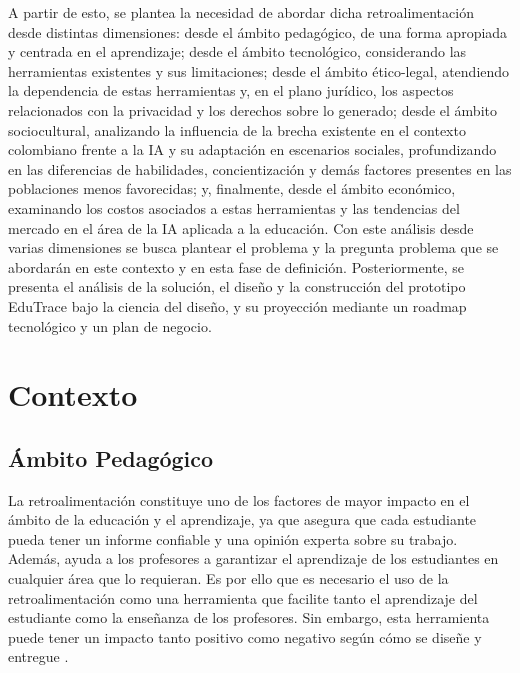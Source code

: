 \documentclass[letterpaper, 10 pt, conference]{ieeeconf}
\begin{document}
A partir de esto, se plantea la necesidad de abordar dicha retroalimentación desde distintas dimensiones: desde el ámbito pedagógico, de una forma apropiada y centrada en el aprendizaje; desde el ámbito tecnológico, considerando las herramientas existentes y sus limitaciones; desde el ámbito ético-legal, atendiendo la dependencia de estas herramientas y, en el plano jurídico, los aspectos relacionados con la privacidad y los derechos sobre lo generado; desde el ámbito sociocultural, analizando la influencia de la brecha existente en el contexto colombiano frente a la IA y su adaptación en escenarios sociales, profundizando en las diferencias de habilidades, concientización y demás factores presentes en las poblaciones menos favorecidas; y, finalmente, desde el ámbito económico, examinando los costos asociados a estas herramientas y las tendencias del mercado en el área de la IA aplicada a la educación. Con este análisis desde varias dimensiones se busca plantear el problema y la pregunta problema que se abordarán en este contexto y en esta fase de definición. Posteriormente, se presenta el análisis de la solución, el diseño y la construcción del prototipo EduTrace bajo la ciencia del diseño, y su proyección mediante un roadmap tecnológico y un plan de negocio.




\section{Contexto} 

\subsection{Ámbito Pedagógico}  

La retroalimentación constituye uno de los factores de mayor impacto en el ámbito de la educación y el aprendizaje, ya que asegura que cada estudiante pueda tener un informe confiable y una opinión experta sobre su trabajo. Además, ayuda a los profesores a garantizar el aprendizaje de los estudiantes en cualquier área que lo requieran. Es por ello que es necesario el uso de la retroalimentación como una herramienta que facilite tanto el aprendizaje del estudiante como la enseñanza de los profesores. Sin embargo, esta herramienta puede tener un impacto tanto positivo como negativo según cómo se diseñe y entregue \cite{1}. 
\end{document}
